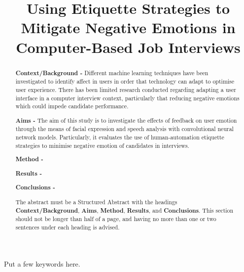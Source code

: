 \documentclass[12pt,a4paper]{article}
\title{Using Etiquette Strategies to Mitigate Negative Emotions in Computer-Based Job Interviews}
\author{} %
\date{}
\begin{document}
\maketitle

\begin{abstract}
	
{\bf Context/Background -} Different machine learning techniques have been investigated to identify affect in users in order that technology can adapt to optimise user experience. There has been limited research conducted regarding adapting a user interface in a computer interview context, particularly that reducing negative emotions which could impede candidate performance.

{\bf Aims -} The aim of this study is to investigate the effects of feedback on user emotion through the means of facial expression and speech analysis with convolutional neural network models. Particularly, it evaluates the use of human-automation etiquette strategies to minimise negative emotion of candidates in interviews.

{\bf Method -}

{\bf Results -}

{\bf Conclusions -}


The abstract must be a Structured Abstract with the headings {\bf Context/Background}, {\bf Aims}, {\bf Method}, {\bf Results}, and {\bf Conclusions}.  This section should not be longer than half of a page, and having no more than one or two sentences under each heading is advised.
\end{abstract}

\begin{keywords}
Put a few keywords here.
\end{keywords}
\end{document}
